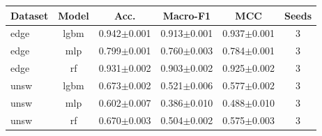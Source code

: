 \begin{tabular}{lccccc}
\toprule
Dataset & Model & Acc. & Macro-F1 & MCC & Seeds \\
\midrule
edge & lgbm & 0.942$\pm$0.001 & 0.913$\pm$0.001 & 0.937$\pm$0.001 & 3 \\
edge & mlp & 0.799$\pm$0.001 & 0.760$\pm$0.003 & 0.784$\pm$0.001 & 3 \\
edge & rf & 0.931$\pm$0.002 & 0.903$\pm$0.002 & 0.925$\pm$0.002 & 3 \\
unsw & lgbm & 0.673$\pm$0.002 & 0.521$\pm$0.006 & 0.577$\pm$0.002 & 3 \\
unsw & mlp & 0.602$\pm$0.007 & 0.386$\pm$0.010 & 0.488$\pm$0.010 & 3 \\
unsw & rf & 0.670$\pm$0.003 & 0.504$\pm$0.002 & 0.575$\pm$0.003 & 3 \\
\bottomrule
\end{tabular}

